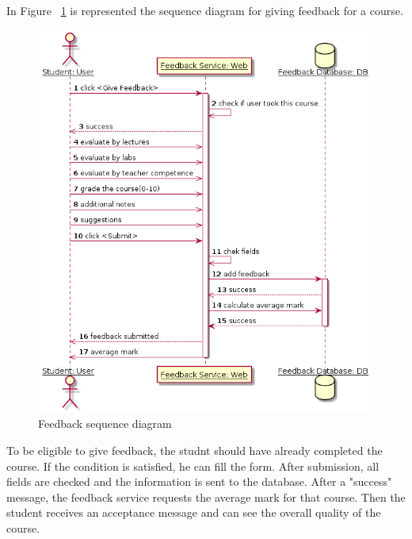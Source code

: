 \documentclass[12pt,a4paper,titlepage]{article}
\begin{document}
In Figure ~\ref{fig:3feedback} is represented the sequence diagram for giving feedback for a course.
\begin{figure}[H]
\centering
\includegraphics[width=15cm]{3feedback}
\caption{Feedback sequence diagram}
\label{fig:3feedback}
\end{figure}
To be eligible to give feedback, the studnt should have already completed the course. If the condition is satisfied, he can fill the form. After submission, all fields are checked and the information is sent to the database. After a "success" message, the feedback service requests the average mark for that course. Then the student receives an acceptance message and can see the overall quality of the course.
\end{document}

